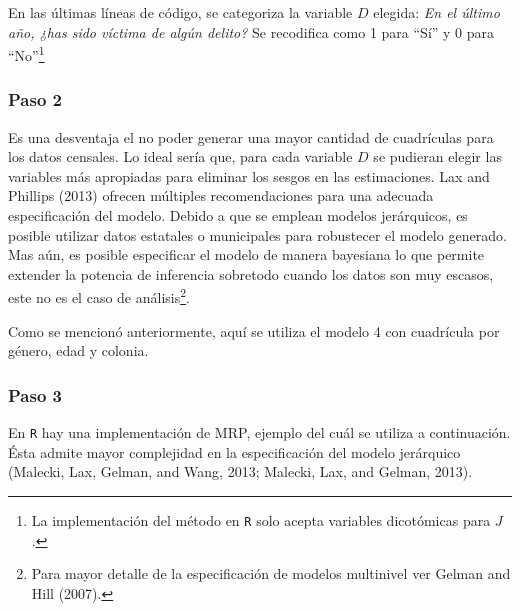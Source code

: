 \documentclass[]{article}
\let\rmarkdownfootnote\footnote%
\def\footnote{\protect\rmarkdownfootnote}
\begin{document}
En las últimas líneas de código, se categoriza la variable $D$ elegida:
\emph{En el último año, ¿has sido víctima de algún delito?} Se
recodifica como 1 para ``Sí'' y 0 para ``No''\footnote{La implementación
  del método en \texttt{R} solo acepta variables dicotómicas para $J$.}

\subsubsection{Paso 2}\label{paso-2}

Es una desventaja el no poder generar una mayor cantidad de cuadrículas
para los datos censales. Lo ideal sería que, para cada variable $D$ se
pudieran elegir las variables más apropiadas para eliminar los sesgos en
las estimaciones. Lax and Phillips (2013) ofrecen múltiples
recomendaciones para una adecuada especificación del modelo. Debido a
que se emplean modelos jerárquicos, es posible utilizar datos estatales
o municipales para robustecer el modelo generado. Mas aún, es posible
especificar el modelo de manera bayesiana lo que permite extender la
potencia de inferencia sobretodo cuando los datos son muy escasos, este
no es el caso de análisis\footnote{Para mayor detalle de la
  especificación de modelos multinivel ver Gelman and Hill (2007).}.

Como se mencionó anteriormente, aquí se utiliza el modelo 4 con
cuadrícula por género, edad y colonia.

\subsubsection{Paso 3}\label{paso-3}

En \texttt{R} hay una implementación de MRP, ejemplo del cuál se utiliza
a continuación. Ésta admite mayor complejidad en la especificación del
modelo jerárquico (Malecki, Lax, Gelman, and Wang, 2013; Malecki, Lax,
and Gelman, 2013).
\end{document}
